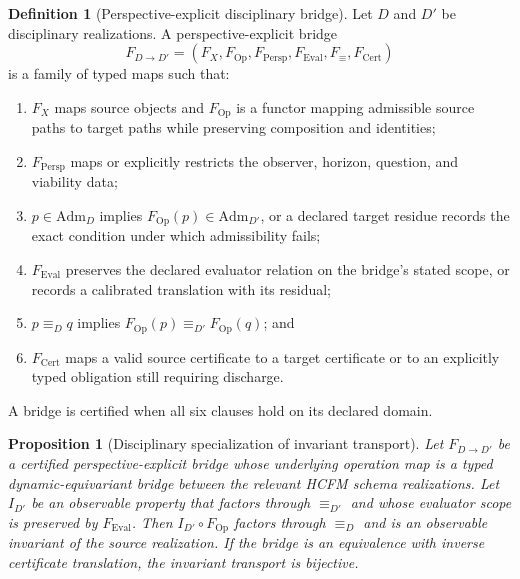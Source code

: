\documentclass[11pt]{article}
\newtheorem{proposition}{Proposition}
\theoremstyle{definition}
\newtheorem{definition}{Definition}
\begin{document}
\begin{definition}[Perspective-explicit disciplinary bridge]
Let $D$ and $D'$ be disciplinary realizations. A perspective-explicit bridge
\begin{equation}
F_{D \to D'} = (F_X, F_{\mathrm{Op}}, F_{\mathrm{Persp}}, F_{\mathrm{Eval}}, F_{\equiv}, F_{\mathrm{Cert}}) \tag{S31}
\end{equation}
is a family of typed maps such that:
\begin{enumerate}[label=(B\arabic*)]
\item[(B1)] $F_X$ maps source objects and $F_{\mathrm{Op}}$ is a functor mapping admissible source paths to target paths while preserving composition and identities;
\item[(B2)] $F_{\mathrm{Persp}}$ maps or explicitly restricts the observer, horizon, question, and viability data;
\item[(B3)] $p \in \mathrm{Adm}_D$ implies $F_{\mathrm{Op}}(p) \in \mathrm{Adm}_{D'}$, or a declared target residue records the exact condition under which admissibility fails;
\item[(B4)] $F_{\mathrm{Eval}}$ preserves the declared evaluator relation on the bridge's stated scope, or records a calibrated translation with its residual;
\item[(B5)] $p \equiv_D q$ implies $F_{\mathrm{Op}}(p) \equiv_{D'} F_{\mathrm{Op}}(q)$; and
\item[(B6)] $F_{\mathrm{Cert}}$ maps a valid source certificate to a target certificate or to an explicitly typed obligation still requiring discharge.
\end{enumerate}
A bridge is certified when all six clauses hold on its declared domain.
\end{definition}

\begin{proposition}[Disciplinary specialization of invariant transport]
Let $F_{D \to D'}$ be a certified perspective-explicit bridge whose underlying operation map is a typed dynamic-equivariant bridge between the relevant HCFM schema realizations. Let $I_{D'}$ be an observable property that factors through $\equiv_{D'}$ and whose evaluator scope is preserved by $F_{\mathrm{Eval}}$. Then $I_{D'} \circ F_{\mathrm{Op}}$ factors through $\equiv_D$ and is an observable invariant of the source realization. If the bridge is an equivalence with inverse certificate translation, the invariant transport is bijective.
\end{proposition}
\end{document}
